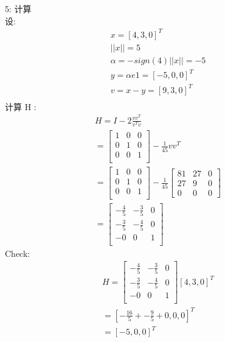 \documentclass[12pt]{article}
\begin{document}
\begin{flushleft}
    5: 计算 \\
    设: \\
    \begin{align}
        x = [4, 3, 0]^{T}              \\
        ||x|| = 5                      \\
        \alpha = -sign(4)||x|| = -5    \\
        y = \alpha e1 = [-5, 0, 0]^{T} \\
        v = x - y = [9, 3, 0]^{T}      \\
    \end{align}
    计算 H :\\
    \begin{align}
        H = I -2\frac{vv^{T}}{v^{T}v}               \\
        =\begin{bmatrix}
             1 & 0 & 0 \\
             0 & 1 & 0 \\
             0 & 0 & 1 \\
         \end{bmatrix} - \frac{1}{45}vv^{T}         \\
        =\begin{bmatrix}
             1 & 0 & 0 \\
             0 & 1 & 0 \\
             0 & 0 & 1 \\
         \end{bmatrix} - \frac{1}{45}\begin{bmatrix}
                                         81 & 27 & 0 \\
                                         27 & 9  & 0 \\
                                         0  & 0  & 0
                                     \end{bmatrix} \\
        =\begin{bmatrix}
             -\frac{4}{5} & -\frac{3}{5} & 0 \\
             -\frac{3}{5} & -\frac{4}{5} & 0 \\
             -0           & 0            & 1 \\
         \end{bmatrix}
    \end{align}
    Check: \\
    \begin{align}
        H = \begin{bmatrix}
                -\frac{4}{5} & -\frac{3}{5} & 0 \\
                -\frac{3}{5} & -\frac{4}{5} & 0 \\
                -0           & 0            & 1 \\
            \end{bmatrix}[4, 3, 0]^{T}            \\
        = [-\frac{16}{5} + -\frac{9}{5} + 0, 0, 0]^{T} \\
        = [-5, 0, 0]^{T}                               \\
    \end{align}


\end{flushleft}
\end{document}
